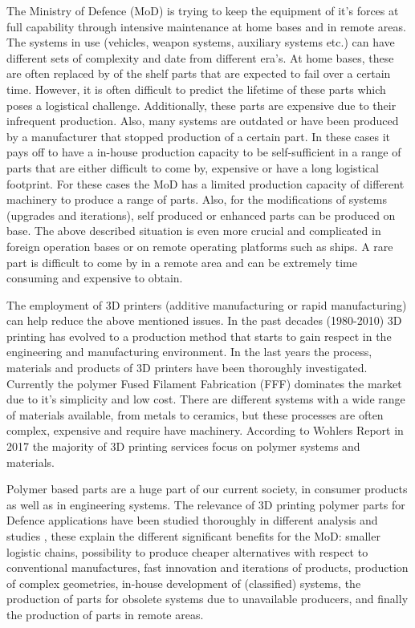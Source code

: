 The Ministry of Defence (MoD) is trying to keep the equipment of it's forces at full capability through intensive maintenance at home bases and in remote areas. The systems in use (vehicles, weapon systems, auxiliary systems etc.) can have different sets of complexity and date from different era's. At home bases, these are often replaced by of the shelf parts that are expected to fail over a certain time. However, it is often difficult to predict the lifetime of these parts which poses a logistical challenge. Additionally, these parts are expensive due to their infrequent production. Also, many systems are outdated or have been produced by a manufacturer that stopped production of a certain part. In these cases it pays off to have a in-house production capacity to be self-sufficient in a range of parts that are either difficult to come by, expensive or have a long logistical footprint. For these cases the MoD has a limited production capacity of different machinery to produce a range of parts. Also, for the modifications of systems (upgrades and iterations), self produced or enhanced parts can be produced on base. The above described situation is even more crucial and complicated in foreign operation bases or on remote operating platforms such as ships. A rare part is difficult to come by in a remote area and can be extremely time consuming and expensive to obtain. 

The employment of 3D printers (additive manufacturing or rapid manufacturing) can help reduce the above mentioned issues. In the past decades (1980-2010) 3D printing has evolved to a production method that starts to gain respect in the engineering and manufacturing environment. In the last years the process, materials and products of 3D printers have been thoroughly investigated. Currently the polymer Fused Filament Fabrication (FFF) dominates the market due to it's simplicity and low cost. There are different systems with a wide range of materials available, from metals to ceramics, but these processes are often complex, expensive and require have machinery. According to Wohlers Report in 2017 \cite{WohlersAssociates2017WohlersIndustry} the majority of 3D printing services focus on polymer systems and materials. 

Polymer based parts are a huge part of our current society, in consumer products as well as in engineering systems. The relevance of 3D printing polymer parts for Defence applications have been studied thoroughly in different analysis and studies \cite{Bastiaans2015DeDefensie} \cite{Joyce20143DDefense}, these explain the different significant benefits for the MoD: smaller logistic chains, possibility to produce cheaper alternatives with respect to conventional manufactures, fast innovation and iterations of products, production of complex geometries, in-house development of (classified) systems, the production of parts for obsolete systems due to unavailable producers, and finally the production of parts in remote areas.

